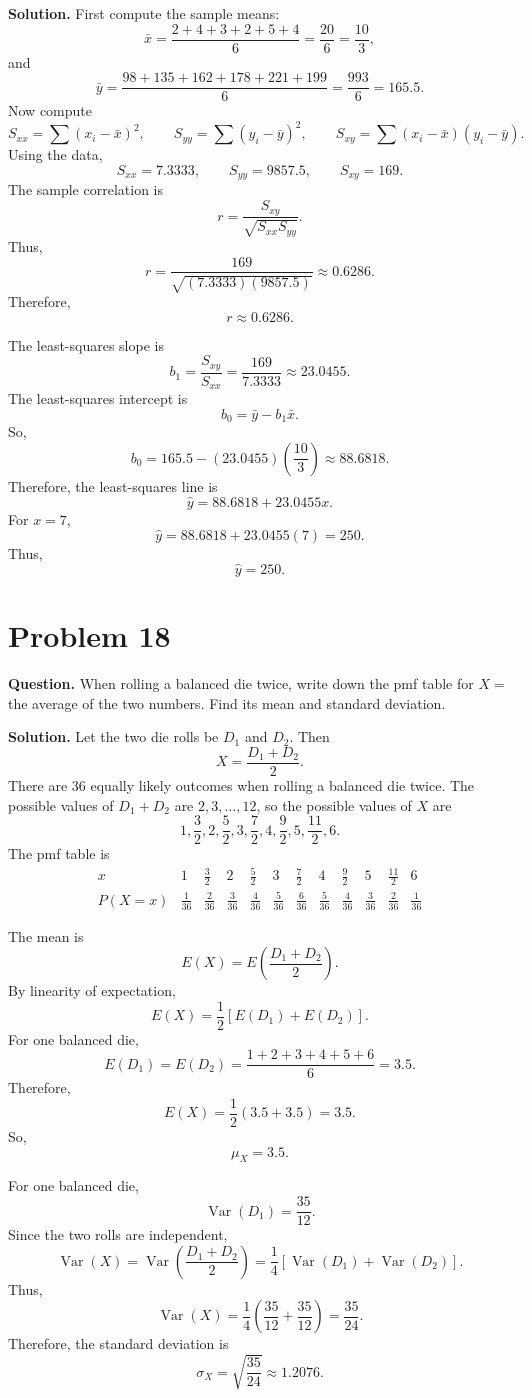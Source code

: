 \documentclass[11pt]{article}
\begin{document}
\textbf{Solution.} First compute the sample means:
\[
\bar x=\frac{2+4+3+2+5+4}{6}=\frac{20}{6}=\frac{10}{3},
\]
and
\[
\bar y=\frac{98+135+162+178+221+199}{6}=\frac{993}{6}=165.5.
\]
Now compute
\[
S_{xx}=\sum (x_i-\bar x)^2, \qquad S_{yy}=\sum (y_i-\bar y)^2, \qquad S_{xy}=\sum (x_i-\bar x)(y_i-\bar y).
\]
Using the data,
\[
S_{xx}=7.3333, \qquad S_{yy}=9857.5, \qquad S_{xy}=169.
\]
The sample correlation is
\[
r=\frac{S_{xy}}{\sqrt{S_{xx}S_{yy}}}.
\]
Thus,
\[
r=\frac{169}{\sqrt{(7.3333)(9857.5)}}\approx 0.6286.
\]
Therefore,
\[
\boxed{r\approx 0.6286}.
\]

The least-squares slope is
\[
b_1=\frac{S_{xy}}{S_{xx}}=\frac{169}{7.3333}\approx 23.0455.
\]
The least-squares intercept is
\[
b_0=\bar y-b_1\bar x.
\]
So,
\[
b_0=165.5-(23.0455)\left(\frac{10}{3}\right)\approx 88.6818.
\]
Therefore, the least-squares line is
\[
\boxed{\hat y=88.6818+23.0455x}.
\]
For $x=7$,
\[
\hat y=88.6818+23.0455(7)=250.
\]
Thus,
\[
\boxed{\hat y=250}.
\]

\newpage
\section*{Problem 18}

\textbf{Question.} When rolling a balanced die twice, write down the pmf table for $X=$ the average of the two numbers. Find its mean and standard deviation.

\textbf{Solution.} Let the two die rolls be $D_1$ and $D_2$. Then
\[
X=\frac{D_1+D_2}{2}.
\]
There are $36$ equally likely outcomes when rolling a balanced die twice. The possible values of $D_1+D_2$ are $2,3,\ldots,12$, so the possible values of $X$ are
\[
1,\frac32,2,\frac52,3,\frac72,4,\frac92,5,\frac{11}{2},6.
\]
The pmf table is
\[
\begin{array}{c|ccccccccccc}
x & 1 & \frac32 & 2 & \frac52 & 3 & \frac72 & 4 & \frac92 & 5 & \frac{11}{2} & 6\\
\hline
P(X=x)
& \frac{1}{36}
& \frac{2}{36}
& \frac{3}{36}
& \frac{4}{36}
& \frac{5}{36}
& \frac{6}{36}
& \frac{5}{36}
& \frac{4}{36}
& \frac{3}{36}
& \frac{2}{36}
& \frac{1}{36}
\end{array}
\]

The mean is
\[
E(X)=E\left(\frac{D_1+D_2}{2}\right).
\]
By linearity of expectation,
\[
E(X)=\frac{1}{2}\left[E(D_1)+E(D_2)\right].
\]
For one balanced die,
\[
E(D_1)=E(D_2)=\frac{1+2+3+4+5+6}{6}=3.5.
\]
Therefore,
\[
E(X)=\frac{1}{2}(3.5+3.5)=3.5.
\]
So,
\[
\boxed{\mu_X=3.5}.
\]

For one balanced die,
\[
\operatorname{Var}(D_1)=\frac{35}{12}.
\]
Since the two rolls are independent,
\[
\operatorname{Var}(X)=\operatorname{Var}\left(\frac{D_1+D_2}{2}\right)=\frac{1}{4}\left[\operatorname{Var}(D_1)+\operatorname{Var}(D_2)\right].
\]
Thus,
\[
\operatorname{Var}(X)=\frac{1}{4}\left(\frac{35}{12}+\frac{35}{12}\right)=\frac{35}{24}.
\]
Therefore, the standard deviation is
\[
\boxed{\sigma_X=\sqrt{\frac{35}{24}}\approx 1.2076}.
\]
\end{document}
